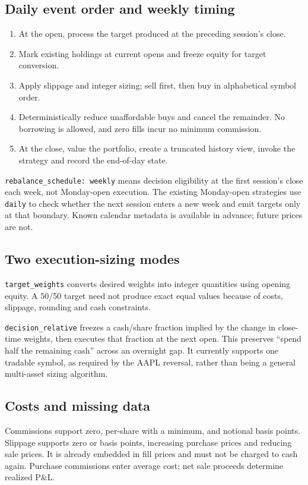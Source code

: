 \documentclass[11pt]{article}
\newcommand{\code}[1]{\nolinkurl{#1}}
\let\originalsubsection\subsection
\renewcommand{\subsection}{\Needspace{8\baselineskip}\originalsubsection}
\begin{document}
\subsection{Daily event order and weekly timing}
\begin{enumerate}
\item At the open, process the target produced at the preceding session's close.
\item Mark existing holdings at current opens and freeze equity for target conversion.
\item Apply slippage and integer sizing; sell first, then buy in alphabetical symbol order.
\item Deterministically reduce unaffordable buys and cancel the remainder. No borrowing is allowed, and zero fills incur no minimum commission.
\item At the close, value the portfolio, create a truncated history view, invoke the strategy and record the end-of-day state.
\end{enumerate}
\code{rebalance_schedule: weekly} means decision eligibility at the first session's close each week, not Monday-open execution. The existing Monday-open strategies use \code{daily} to check whether the next session enters a new week and emit targets only at that boundary. Known calendar metadata is available in advance; future prices are not.

\subsection{Two execution-sizing modes}
\code{target_weights} converts desired weights into integer quantities using opening equity. A 50/50 target need not produce exact equal values because of costs, slippage, rounding and cash constraints.

\code{decision_relative} freezes a cash/share fraction implied by the change in close-time weights, then executes that fraction at the next open. This preserves ``spend half the remaining cash'' across an overnight gap. It currently supports one tradable symbol, as required by the AAPL reversal, rather than being a general multi-asset sizing algorithm.

\subsection{Costs and missing data}
Commissions support zero, per-share with a minimum, and notional basis points. Slippage supports zero or basis points, increasing purchase prices and reducing sale prices. It is already embedded in fill prices and must not be charged to cash again. Purchase commissions enter average cost; net sale proceeds determine realized P\&L.
\end{document}
